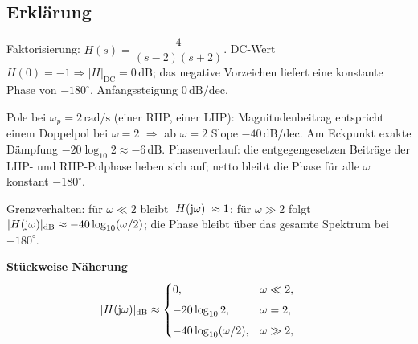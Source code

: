 \subsection{Erklärung}
\vspace{5mm}
\begin{description}[leftmargin=1.2em,labelsep=.6em,font=\bfseries]
\item[Schritt 1] Faktorisierung: $H(s)=\dfrac{4}{(s-2)(s+2)}$. DC-Wert $H(0)=-1\Rightarrow |H|_{\mathrm{DC}}=0\,\mathrm{dB}$; das negative Vorzeichen liefert eine konstante Phase von $-180^\circ$. Anfangssteigung $0\,\mathrm{dB/dec}$.
\item[Schritt 2] Pole bei $\omega_p=2\,\mathrm{rad/s}$ (einer RHP, einer LHP): Magnitudenbeitrag entspricht einem Doppelpol bei $\omega=2$ $\Rightarrow$ ab $\omega=2$ Slope $-40\,\mathrm{dB/dec}$. Am Eckpunkt exakte Dämpfung $-20\log_{10}2\approx-6\,\mathrm{dB}$. Phasenverlauf: die entgegengesetzen Beiträge der LHP- und RHP-Polphase heben sich auf; netto bleibt die Phase für alle $\omega$ konstant $-180^\circ$.
\item[Schritt 3] Grenzverhalten: für $\omega\ll2$ bleibt $|H(\operatorname{j}\!\omega)|\approx1$; für $\omega\gg2$ folgt $|H(\operatorname{j}\!\omega)|_{\mathrm{dB}}\approx-40\log_{10}(\omega/2)$; die Phase bleibt über das gesamte Spektrum bei $-180^\circ$.
\end{description}

\vspace{0.5cm}
\medskip
\noindent\textbf{Stückweise Näherung}
\[
|H(\operatorname{j}\!\omega)|_{\mathrm{dB}}\approx
\begin{cases}
0,& \omega\ll2,\\[4pt]
-20\log_{10}2,& \omega=2,\\[4pt]
-40\log_{10}(\omega/2),& \omega\gg2,
\end{cases}
\qquad
\]
\newpage
